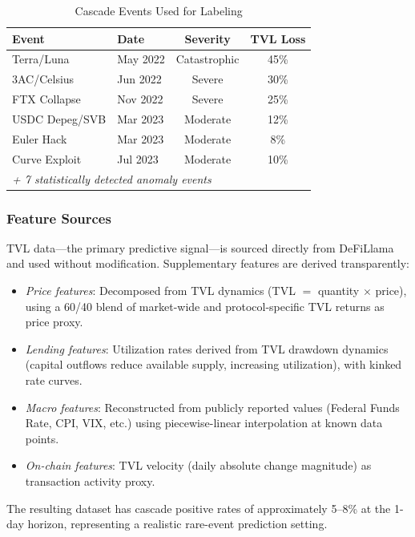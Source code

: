 \documentclass[journal]{IEEEtran}
\begin{document}
\begin{table}[!t]
\caption{Cascade Events Used for Labeling}
\label{tab:events}
\centering
\footnotesize
\begin{tabular}{llcc}
\toprule
\textbf{Event} & \textbf{Date} & \textbf{Severity} & \textbf{TVL Loss} \\
\midrule
Terra/Luna & May 2022 & Catastrophic & 45\% \\
3AC/Celsius & Jun 2022 & Severe & 30\% \\
FTX Collapse & Nov 2022 & Severe & 25\% \\
USDC Depeg/SVB & Mar 2023 & Moderate & 12\% \\
Euler Hack & Mar 2023 & Moderate & 8\% \\
Curve Exploit & Jul 2023 & Moderate & 10\% \\
\midrule
\multicolumn{4}{l}{\emph{+ 7 statistically detected anomaly events}} \\
\bottomrule
\end{tabular}
\end{table}

\subsubsection{Feature Sources}

TVL data---the primary predictive signal---is sourced directly from DeFiLlama and used without modification. Supplementary features are derived transparently:
\begin{itemize}
    \item \emph{Price features}: Decomposed from TVL dynamics (TVL $=$ quantity $\times$ price), using a 60/40 blend of market-wide and protocol-specific TVL returns as price proxy.
    \item \emph{Lending features}: Utilization rates derived from TVL drawdown dynamics (capital outflows reduce available supply, increasing utilization), with kinked rate curves.
    \item \emph{Macro features}: Reconstructed from publicly reported values (Federal Funds Rate, CPI, VIX, etc.) using piecewise-linear interpolation at known data points.
    \item \emph{On-chain features}: TVL velocity (daily absolute change magnitude) as transaction activity proxy.
\end{itemize}

The resulting dataset has cascade positive rates of approximately 5--8\% at the 1-day horizon, representing a realistic rare-event prediction setting.
\end{document}
